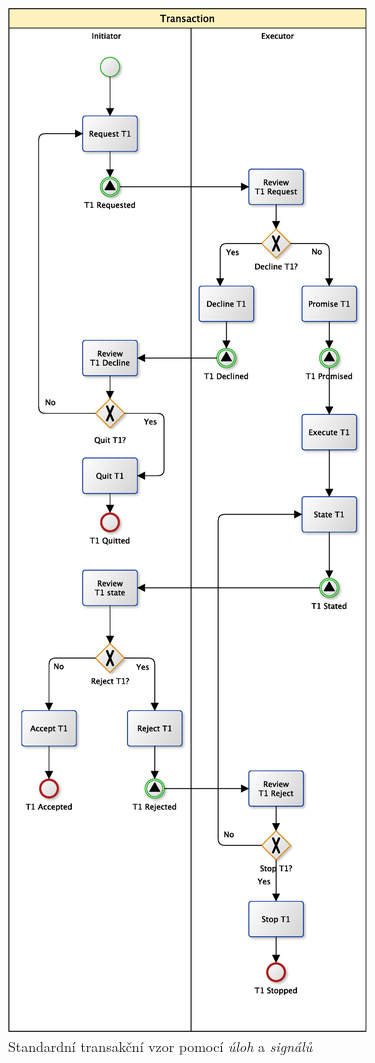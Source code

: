 \begin{figure}[htbp]
\centering
\includegraphics[width=\textwidth,height=\textheight,keepaspectratio]{obrazky/transaction-standard-signals}
\caption{Standardní transakční vzor pomocí \textit{úloh} a \textit{signálů}}
\label{fig:St_trans_ulohy_signaly}
\end{figure}

